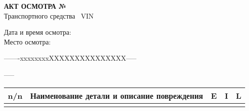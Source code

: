 \documentclass[a4paper,10pt]{report}
\begin{document}
    


%

\begin{center}
    {\Large \textbf{АКТ ОСМОТРА   № }}\\
    \vspace{2mm}
    {\normalsize Транспортного средства \, VIN \vin}
\end{center}

\vspace{2mm}
\noindent Дата и время осмотра:\\
\noindent Место осмотра:\\
\vspace{2mm}

\noindent\parbox[l][5mm]{60mm}{ -------xxxxxxxxXXXXXXXXXXXXXXX----- }   \hspace{50mm} %
\parbox[l][5mm]{50mm}{  -----}

\begin{longtable}{G{3mm}|M{130mm}|G{5mm}|G{5mm}|G{5mm}}
     \hline %
    \hline
    \toprule 
    \bf  {\footnotesize  n/n}  &\bf {\small Наименование  детали и описание повреждения} & \bf {\small E} & \bf {\small I}& \bf {\small L}\\\hline\hline   \toprule  \endhead 
   

  \end{longtable}
\end{document}
